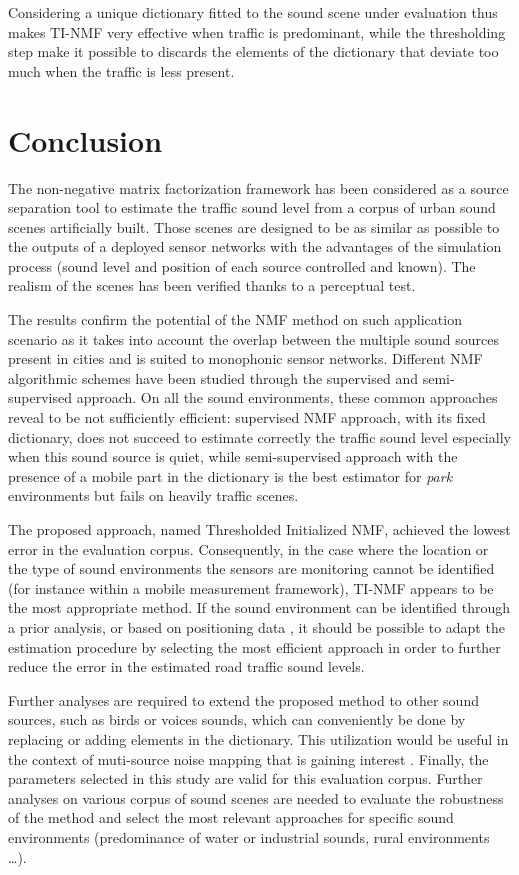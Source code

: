 \documentclass[review,5p,twocolumn,sort&compress,times]{elsarticle}
\begin{document}
Considering a unique dictionary fitted to the sound scene under evaluation thus makes TI-NMF very effective when traffic is predominant, while the thresholding step make it possible to discards the elements of the dictionary that deviate too much when the traffic is less present.

\section{Conclusion}

The non-negative matrix factorization framework has been considered as a source separation tool to estimate the traffic sound level  from a corpus of urban sound scenes artificially built. Those scenes are designed to be as similar as possible to the outputs of a deployed sensor networks with the advantages of the simulation process (sound level and position of each source controlled and known). The realism of the scenes has been verified thanks to a perceptual test.

The results confirm the potential of the NMF method on such application scenario as it takes into account the overlap between the multiple sound sources present in cities and is suited to monophonic sensor networks. Different NMF algorithmic schemes have been studied through the supervised and semi-supervised approach. On all the sound environments, these common approaches reveal to be not sufficiently efficient: supervised NMF approach, with its fixed dictionary, does not succeed to estimate correctly the traffic sound level especially when this sound source is quiet, while semi-supervised approach with the presence of a mobile part in the dictionary is the best estimator for \textit{park} environments but fails on heavily traffic scenes.

The proposed approach, named Thresholded Initialized NMF, achieved the lowest error in the evaluation corpus. Consequently, in the case where the location or the type of sound environments the sensors are monitoring cannot be identified (for instance within a mobile measurement framework), TI-NMF appears to be the most appropriate method. If the sound environment can be identified through a prior analysis, or based on positioning data \cite{can2015noise,lavandier2016urban}, it should be possible to adapt the estimation procedure by selecting the most efficient approach in order to further reduce the error in the estimated road traffic sound levels.

Further analyses are required to extend the proposed method to other sound sources, such as birds or voices sounds, which can conveniently be done by replacing or adding elements in the dictionary. This utilization would be useful in the context of muti-source noise mapping that is gaining interest \cite{aumond2017Probabilistic, aletta2015soundscape}. Finally, the parameters selected in this study are valid for this evaluation corpus. Further analyses on various corpus of sound scenes are needed to evaluate the robustness of the method and select the most relevant approaches for specific sound environments (predominance of water or industrial sounds, rural environments \dots).
\end{document}
